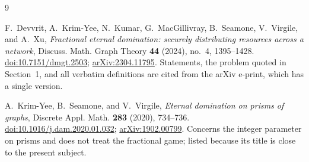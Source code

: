 \documentclass[11pt]{amsart}
\theoremstyle{remark}
\begin{document}
\begin{thebibliography}{9}

F.~Devvrit, A.~Krim-Yee, N.~Kumar, G.~MacGillivray, B.~Seamone, V.~Virgile, and
A.~Xu,
\emph{Fractional eternal domination: securely distributing resources across a
network},
Discuss. Math. Graph Theory \textbf{44} (2024), no.~4, 1395--1428.
\href{https://doi.org/10.7151/dmgt.2503}{doi:10.7151/dmgt.2503};
\href{https://arxiv.org/abs/2304.11795}{arXiv:2304.11795}.
Statements, the problem quoted in Section~1, and all verbatim definitions are
cited from the arXiv e-print, which has a single version.

A.~Krim-Yee, B.~Seamone, and V.~Virgile,
\emph{Eternal domination on prisms of graphs},
Discrete Appl. Math. \textbf{283} (2020), 734--736.
\href{https://doi.org/10.1016/j.dam.2020.01.032}{doi:10.1016/j.dam.2020.01.032};
\href{https://arxiv.org/abs/1902.00799}{arXiv:1902.00799}.
Concerns the integer parameter on prisms and does not treat the fractional
game; listed because its title is close to the present subject.

\end{thebibliography}
\end{document}
